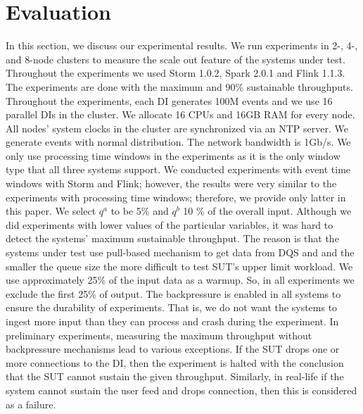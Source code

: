 
\section{Evaluation}
\label{eval}
In this section, we discuss our experimental results. We run experiments in 2-, 4-, and 8-node clusters to measure the scale out feature of the systems under test. Throughout the experiments we used Storm 1.0.2, Spark 2.0.1 and Flink 1.1.3.  The experiments are done with the maximum and 90\% sustainable throughputs. Throughout the experiments, each DI generates 100M events and we use 16 parallel DIs in the cluster. 
We allocate 16 CPUs and 16GB RAM for every node. %
All nodes' system clocks in the cluster are synchronized via an NTP server. We generate events with normal distribution. The network bandwidth is 1Gb/s. We only use processing time windows in the experiments as it is the only window type that all three systems support. We conducted experiments with event time windows with Storm and Flink; however, the results were very similar to the experiments with processing time windows; therefore, we provide only latter in this paper. 
We select $q^{a}$ to be 5\% and $q^{b}$ 10 \% of the overall input. Although we did experiments with lower values of the particular variables, it was hard to detect the systems' maximum sustainable throughput. The reason is that  the systems under test use pull-based mechanism to get data from DQS and and the smaller the queue size the more difficult to test SUT's upper limit workload.  We use approximately 25\% of the input data as a warmup. So, in all experiments we exclude the first 25\% of output. The backpressure is enabled in all systems to ensure the durability of experiments. That is, we do not want the systems to ingest more input than they can process and crash during the experiment. In preliminary experiments, measuring the maximum throughput without backpressure mechanisms lead to various exceptions. If the SUT drops one or more connections to the DI, then the experiment is halted with the conclusion that the SUT cannot sustain the given throughput. Similarly, in real-life if the system cannot sustain the user feed and drops connection, then this is considered as a failure.  

